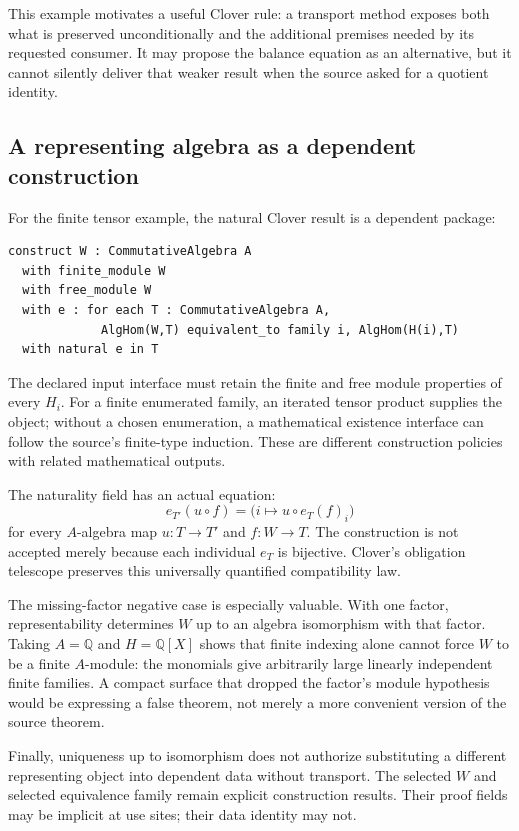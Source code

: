 \documentclass[11pt,a4paper]{article}
\newcommand{\Q}{\mathbb Q}
\theoremstyle{definition}
\theoremstyle{remark}
\begin{document}
This example motivates a useful Clover rule: a transport method exposes both
what is preserved unconditionally and the additional premises needed by its
requested consumer. It may propose the balance equation as an alternative,
but it cannot silently deliver that weaker result when the source asked for
a quotient identity.

\subsection{A representing algebra as a dependent construction}

For the finite tensor example, the natural Clover result is a dependent package:
\begin{lstlisting}
construct W : CommutativeAlgebra A
  with finite_module W
  with free_module W
  with e : for each T : CommutativeAlgebra A,
             AlgHom(W,T) equivalent_to family i, AlgHom(H(i),T)
  with natural e in T
\end{lstlisting}
The declared input interface must retain the finite and free module properties
of every $H_i$. For a finite enumerated family, an iterated tensor product
supplies the object; without a chosen enumeration, a mathematical existence
interface can follow the source's finite-type induction. These are different
construction policies with related mathematical outputs.

The naturality field has an actual equation:
\[
 e_{T'}(u\circ f)=\bigl(i\mapsto u\circ e_T(f)_i\bigr)
\]
for every $A$-algebra map $u:T\to T'$ and $f:W\to T$. The construction is
not accepted merely because each individual $e_T$ is bijective. Clover's
obligation telescope preserves this universally quantified compatibility law.

The missing-factor negative case is especially valuable. With one factor,
representability determines $W$ up to an algebra isomorphism with that factor.
Taking $A=\Q$ and $H=\Q[X]$ shows that finite indexing alone cannot force $W$
to be a finite $A$-module: the monomials give arbitrarily large linearly
independent finite families. A compact surface that dropped the factor's
module hypothesis would be expressing a false theorem, not merely a more
convenient version of the source theorem.

Finally, uniqueness up to isomorphism does not authorize substituting a different
representing object into dependent data without transport. The selected $W$
and selected equivalence family remain explicit construction results. Their
proof fields may be implicit at use sites; their data identity may not.
\end{document}
